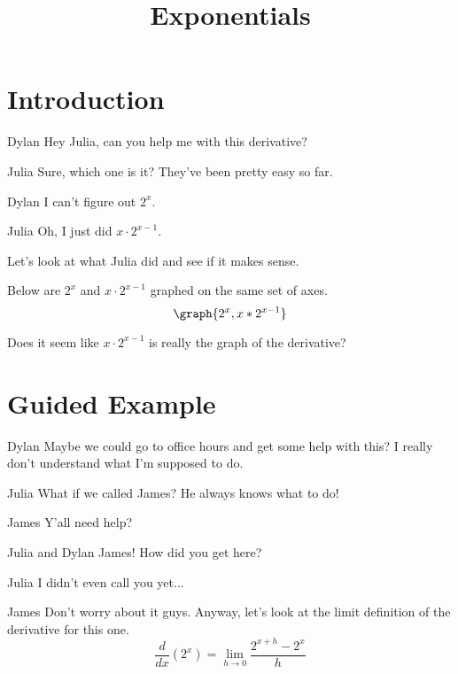 \documentclass{ximera}
\title{Exponentials}
\begin{document}
\maketitle
\section{Introduction}
\begin{dialogue}
\item[Dylan] Hey Julia, can you help me with this derivative?
\item[Julia] Sure, which one is it? They've been pretty easy so far.
\item[Dylan] I can't figure out $2^x$.
\item[Julia] Oh, I just did $x \cdot 2^{x-1}$.
\end{dialogue}
Let's look at what Julia did and see if it makes sense.

\begin{question}

Below are $2^x$ and $x \cdot 2^{x-1}$ graphed on the same set of axes.
\[
\graph{2^x,x*2^{x-1}}
\]


Does it seem like $x \cdot 2^{x-1}$ is really the graph of the derivative?

\begin{multipleChoice}
\end{multipleChoice}

\end{question}
\section{Guided Example}
\begin{dialogue}
\item[Dylan] Maybe we could go to office hours and get some help with this? I really don't understand what I'm supposed to do.
\item[Julia] What if we called James? He always knows what to do!
\item[James] Y'all need help?
\item[Julia and Dylan] James! How did you get here?
\item[Julia] I didn't even call you yet...
\item[James] Don't worry about it guys. Anyway, let's look at the limit definition of the derivative for this one. $$\dfrac{d}{dx}(2^x)=\lim_{h \to 0} \dfrac{2^{x+h}-2^x}{h}$$
\end{dialogue}
\end{document}
